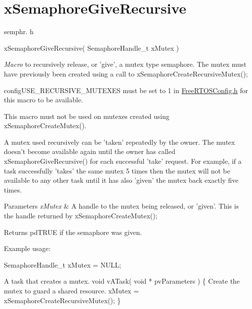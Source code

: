\hypertarget{group__xSemaphoreGiveRecursive}{\section{x\-Semaphore\-Give\-Recursive}
\label{group__xSemaphoreGiveRecursive}
}
semphr. h 
\begin{DoxyPre}xSemaphoreGiveRecursive( SemaphoreHandle\_t xMutex )\end{DoxyPre}


{\itshape Macro} to recursively release, or 'give', a mutex type semaphore. The mutex must have previously been created using a call to x\-Semaphore\-Create\-Recursive\-Mutex();

config\-U\-S\-E\-\_\-\-R\-E\-C\-U\-R\-S\-I\-V\-E\-\_\-\-M\-U\-T\-E\-X\-E\-S must be set to 1 in \hyperlink{FreeRTOSConfig_8h}{Free\-R\-T\-O\-S\-Config.\-h} for this macro to be available.

This macro must not be used on mutexes created using x\-Semaphore\-Create\-Mutex().

A mutex used recursively can be 'taken' repeatedly by the owner. The mutex doesn't become available again until the owner has called x\-Semaphore\-Give\-Recursive() for each successful 'take' request. For example, if a task successfully 'takes' the same mutex 5 times then the mutex will not be available to any other task until it has also 'given' the mutex back exactly five times.


\begin{DoxyParams}{Parameters}
{\em x\-Mutex} & A handle to the mutex being released, or 'given'. This is the handle returned by x\-Semaphore\-Create\-Mutex();\\
\hline
\end{DoxyParams}
\begin{DoxyReturn}{Returns}
pd\-T\-R\-U\-E if the semaphore was given.
\end{DoxyReturn}
Example usage\-: 
\begin{DoxyPre}
 SemaphoreHandle\_t xMutex = NULL;\end{DoxyPre}



\begin{DoxyPre}A task that creates a mutex.
 void vATask( void * pvParameters )
 \{
Create the mutex to guard a shared resource.
    xMutex = xSemaphoreCreateRecursiveMutex();
 \}\end{DoxyPre}



